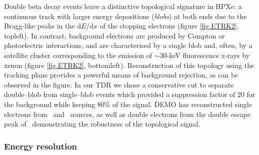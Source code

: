 %

Double beta decay events leave a distinctive topological signature in HPXe: a continuous track with larger energy depositions (\emph{blobs}) at both ends due to the Bragg-like peaks in the d$E$/d$x$ of the stopping electrons (figure \ref{fig.ETRK2}, topleft). In contrast, background electrons are produced by Compton or photoelectric interactions, and are characterised by a single blob and, often, by a satellite cluster corresponding to the emission of $\sim30$-keV fluorescence x-rays by xenon (figure \ref{fig.ETRK2}, bottomleft).
Reconstruction of this topology using the tracking plane provides a powerful means of background rejection, as can be observed in the figure. In our TDR we chose a conservative cut to separate double--blob from single--blob events which provided a suppression factor of 20 for the background while keeping 80\% of the signal.  DEMO has reconstructed single electrons from \NA\ and \CS\ sources, as well as double electrons from the double escape peak of \TL\, demonstrating the robustness of the topological signal. 

%

\subsubsection*{Energy resolution}

